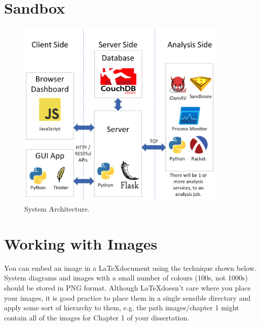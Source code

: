 \section{Sandbox}



\begin{figure}[h!]
    \includegraphics[width=0.9\textwidth]{images/architecture.png}
    \caption{System Architecture.}
    \label{image:sysArchitecture}
\end{figure}



\section{Working with Images}
You can embed an image in a \LaTeX document using the technique shown below. System diagrams and images with a small number of colours (100s, not 1000s) should be stored in PNG format. Although \LaTeX doesn't care where you place your images, it is good practice to place them in a single sensible directory and apply some sort of hierarchy to them, e.g. the path images/chapter 1 might contain all of the images for Chapter 1 of your dissertation.

